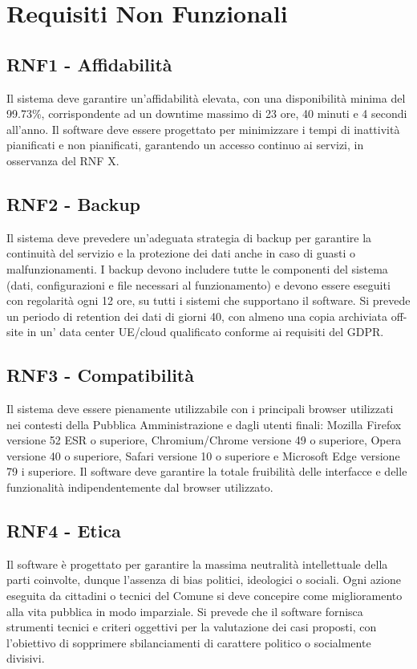 \chapter{Requisiti Non Funzionali}
\section{RNF1 - Affidabilità}
Il sistema deve garantire un'affidabilità elevata, con una disponibilità minima del 99.73{\%}, corrispondente ad un downtime massimo di 23 ore, 40 minuti e 4 secondi all'anno. Il software deve essere progettato per minimizzare i tempi di inattività pianificati e non pianificati, garantendo un accesso continuo ai servizi, in osservanza del RNF X.

\section{RNF2 - Backup}
Il sistema deve prevedere un’adeguata strategia di backup per garantire la continuità del servizio e la protezione dei dati anche in caso di guasti o malfunzionamenti.
I backup devono includere tutte le componenti del sistema (dati, configurazioni e file necessari al funzionamento) e devono essere eseguiti con regolarità ogni 12 ore, su tutti i sistemi che supportano il software. Si prevede un periodo di retention dei dati di giorni 40, con almeno una copia archiviata off-site in un' data center UE/cloud qualificato conforme ai requisiti del GDPR.

\section{RNF3 - Compatibilità}
Il sistema deve essere pienamente utilizzabile con i principali browser utilizzati nei contesti della Pubblica Amministrazione e dagli utenti finali: Mozilla Firefox versione 52 ESR o superiore, Chromium/Chrome versione 49 o superiore, Opera versione 40 o superiore, Safari versione 10 o superiore e Microsoft Edge versione 79 i superiore. Il software deve garantire la totale fruibilità delle interfacce e delle funzionalità indipendentemente dal browser utilizzato.

\section{RNF4 - Etica}
Il software è progettato per garantire la massima neutralità intellettuale della parti coinvolte, dunque l'assenza di bias politici, ideologici o sociali. Ogni azione eseguita da cittadini o tecnici del Comune si deve concepire come miglioramento alla vita pubblica in modo imparziale. Si prevede che il software fornisca strumenti tecnici e criteri oggettivi per la valutazione dei casi proposti, con l'obiettivo di sopprimere sbilanciamenti di carattere politico o socialmente divisivi. 

